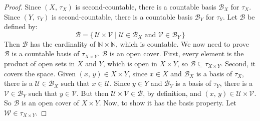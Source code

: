 \documentclass{article}
\theoremstyle{plain}
\theoremstyle{normal}
\begin{document}
        \begin{proof}
            Since $(X,\,\tau_{X})$ is second-countable, there is a countable
            basis $\mathcal{B}_{X}$ for $\tau_{X}$. Since $(Y,\,\tau_{Y})$ is
            second-countable, there is a countable basis $\mathcal{B}_{Y}$ for
            $\tau_{Y}$. Let $\mathcal{B}$ be defined by:
            \begin{equation}
                \mathcal{B}=
                    \{\,\mathcal{U}\times\mathcal{V}\;|\;
                    \mathcal{U}\in\mathcal{B}_{X}\textrm{ and }
                    \mathcal{V}\in\mathcal{B}_{Y}\,\}
            \end{equation}
            Then $\mathcal{B}$ has the cardinality of
            $\mathbb{N}\times\mathbb{N}$, which is countable. We now need to
            prove $\mathcal{B}$ is a countable basis of $\tau_{X\times{Y}}$.
            $\mathcal{B}$ is an open cover. First, every element is the
            product of open sets in $X$ and $Y$, which is open in
            $X\times{Y}$, so $\mathcal{B}\subseteq\tau_{X\times{Y}}$. Second,
            it covers the space. Given $(x,\,y)\in{X}\times{Y}$, since
            $x\in{X}$ and $\mathcal{B}_{X}$ is a basis of $\tau_{X}$, there is
            a $\mathcal{U}\in\mathcal{B}_{X}$ such that $x\in\mathcal{U}$.
            Since $y\in{Y}$ and $\mathcal{B}_{Y}$ is a basis of $\tau_{Y}$,
            there is a $\mathcal{V}\in\mathcal{B}_{Y}$ such that
            $y\in\mathcal{V}$. But then
            $\mathcal{U}\times\mathcal{V}\in\mathcal{B}$, by definition, and
            $(x,\,y)\in\mathcal{U}\times\mathcal{V}$. So $\mathcal{B}$ is an
            open cover of $X\times{Y}$. Now, to show it has the basis property.
            Let $\mathcal{W}\in\tau_{X\times{Y}}$.
        \end{proof}
\end{document}
